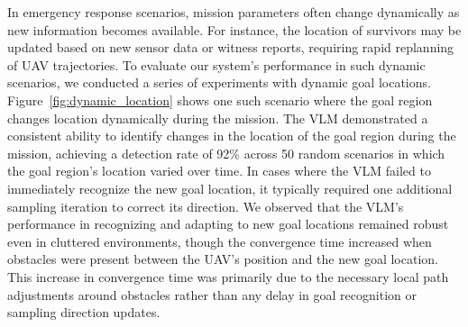In emergency response scenarios, mission parameters often change dynamically as new information becomes available. For instance, the location of survivors may be updated based on new sensor data or witness reports, requiring rapid replanning of UAV trajectories. To evaluate our system's performance in such dynamic scenarios, we conducted a series of experiments with dynamic goal locations. Figure~\ref{fig:dynamic_location} shows one such scenario where the goal region changes location dynamically during the mission.
The VLM demonstrated a consistent ability to identify changes in the location of the goal region during the mission, achieving a detection rate of 92\% across 50 random scenarios in which the goal region's location varied over time. In cases where the VLM failed to immediately recognize the new goal location, it typically required one additional sampling iteration to correct its direction.
We observed that the VLM's performance in recognizing and adapting to new goal locations remained robust even in cluttered environments, though the convergence time increased when obstacles were present between the UAV's position and the new goal location. This increase in convergence time was primarily due to the necessary local path adjustments around obstacles rather than any delay in goal recognition or sampling direction updates.















